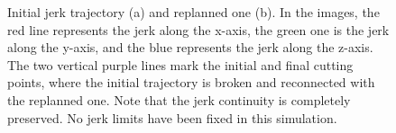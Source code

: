 \begin{figure}[!t]
	\begin{center}
		\begin{minipage}{.45\linewidth}
			\centering
		\end{minipage}
		\begin{minipage}{.45\linewidth}
			\centering
		\end{minipage}
	\end{center}
	\caption{Initial jerk trajectory (a) and replanned one (b).
    In the images, the red line represents the jerk along the x-axis, the green one is the jerk along the y-axis,
    and the blue represents the jerk along the z-axis. The two vertical purple lines mark the initial and final cutting
    points, where the initial trajectory is broken and reconnected with the replanned one. Note that the jerk continuity
    is completely preserved. No jerk limits have been fixed in this simulation.}%
    \label{FIG:REPLANNING-RESULTS-JERK}
\end{figure}
